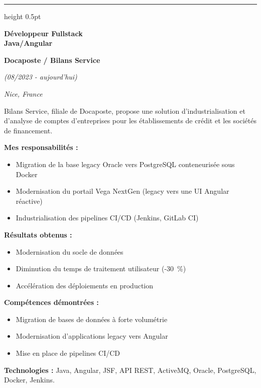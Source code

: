 \documentclass[a4paper,10pt]{article}
\newcommand{\dcsub}[1]{%
  \par\vspace{2.1mm}%
  \noindent\textbf{#1}\par
  \vspace{0.4mm}%
}
\newcommand{\dctech}[1]{%
  \par\vspace{2.0mm}%
  \noindent\textbf{Technologies :} #1\par
}
\newlength{\dcleftw}\setlength{\dcleftw}{51.2mm}
\newlength{\dcgap}\setlength{\dcgap}{2.8mm}
\newcommand{\dcexperience}[2]{%
  \par\noindent
  \begin{minipage}[t]{\dcleftw}
    \raggedright #1
  \end{minipage}%
  \hspace{\dcgap}%
  \begin{minipage}[t]{\dimexpr\textwidth-\dcleftw-\dcgap\relax}
    \raggedright\color{dcbody}#2
  \end{minipage}%
  \par
}
\newcommand{\dcjob}[4]{%
  {\fontsize{11.2}{13.4}\selectfont\bfseries\color{dcnavy}#1}\par
  \vspace{0.7mm}%
  {\fontsize{10}{12}\selectfont\bfseries\color{dcnavy}#2}\par
  \vspace{0.9mm}%
  {\fontsize{8.2}{10}\selectfont\itshape\color{dcmuted}(#3)}\par
  \vspace{0.35mm}%
  {\fontsize{7.8}{9.5}\selectfont\itshape\color{dcgoldsoft}#4}\par
}
\newcommand{\dcrule}{%
  \par\vspace{4.2mm}%
  {\color{dcgold}\hrule height 0.5pt}\par
  \vspace{4.2mm}%
}
\newcommand{\dcpageframe}{%
  \noindent{\color{dcgold}\hrule height 0.5pt}\par
  \vspace{4.5mm}%
}
\newcommand{\dcfooter}[1]{%
  \vfill
  \noindent{\color{dcgold}\hrule height 0.5pt}\par
  \vspace{2.2mm}%
  \noindent{\fontsize{9}{11}\selectfont\color{dcmuted}#1}%
}
\begin{document}
\dcrule

\dcexperience{%
  \dcjob{Développeur Fullstack\\Java/Angular}%
        {Docaposte / Bilans Service}%
        {08/2023 - aujourd'hui}%
        {Nice, France}
}{%
  Bilans Service, filiale de Docaposte, propose une solution d'industrialisation et d'analyse
  de comptes d'entreprises pour les établissements de crédit et les sociétés de financement.

  \dcsub{Mes responsabilités :}
  \begin{itemize}
    \item Migration de la base legacy Oracle vers PostgreSQL conteneurisée sous Docker
    \item Modernisation du portail Vega NextGen (legacy vers une UI Angular réactive)
    \item Industrialisation des pipelines CI/CD (Jenkins, GitLab CI)
  \end{itemize}

  \dcsub{Résultats obtenus :}
  \begin{itemize}
    \item Modernisation du socle de données
    \item Diminution du temps de traitement utilisateur (-30~\%)
    \item Accélération des déploiements en production
  \end{itemize}

  \dcsub{Compétences démontrées :}
  \begin{itemize}
    \item Migration de bases de données à forte volumétrie
    \item Modernisation d'applications legacy vers Angular
    \item Mise en place de pipelines CI/CD
  \end{itemize}

  \dctech{Java, Angular, JSF, API REST, ActiveMQ, Oracle, PostgreSQL, Docker, Jenkins.}
}

\dcfooter{3}
\clearpage

\fontsize{9}{11.2}\selectfont
\dcpageframe
\end{document}
